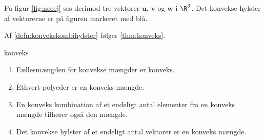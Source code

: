 %
På figur \ref{fig:neeej} ses derimod tre vektorer $\mathbf{u}$, $\mathbf{v}$ og $\mathbf{w}$ i $\R^3$. 
Det konvekse hylster af vektorerne er på figuren markeret med blå.
%

%
Af \ref{defn:konvekskombihylster} følger \ref{thm:konveks}.
%
\begin{thm}{}{konveks}
\begin{enumerate}[label=(\alph*)]
	\item Fællesmængden for konvekse mængder er konveks. 
	\item Ethvert polyeder er en konveks mængde.
	\item En konveks kombination af et endeligt antal elementer fra en konveks mængde tilhører også den mængde. 
	\item Det konvekse hylster af et endeligt antal vektorer er en konveks mængde. 
\end{enumerate}
\end{thm}
%
%
